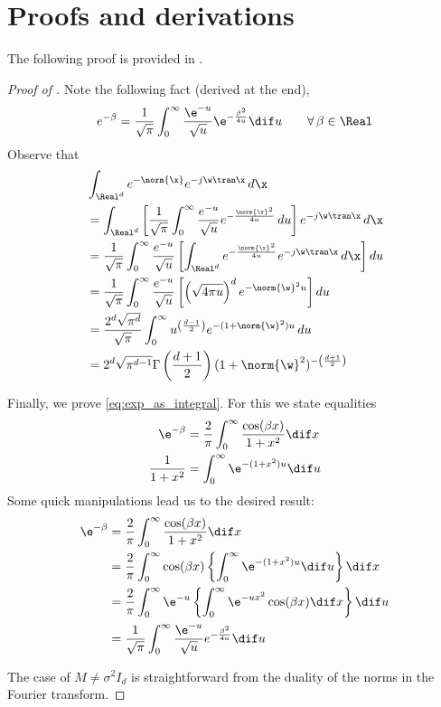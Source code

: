 \documentclass{article}
\def\cite{\citep}
\theoremstyle{plain}
\begin{document}
\section{Proofs and derivations}
\label{appendix:proofs}
The following proof is provided in \cite{Stein1971}.
\begin{proof}[Proof of ]
    Note the following fact (derived at the end),
    \begin{align}e^{-\beta}=  \frac{1}{\sqrt{\pi}} \int_0^{\infty} \frac{\e^{-
    u}}{\sqrt{u}} \e^{- \frac{\beta^2}{4 u} } \dif u\qquad \forall\, \beta\in\Real \label{eq:exp_as_integral}
    \end{align}
    Observe that
    \begin{align*}
    &\int_{\Real^d} e^{-\norm{\x}} e^{- j\w\tran\x}\mathop{d\x} \\
    &=\int_{\Real^d}
    \left[ \frac{1}{\sqrt{\pi}} \int_0^{\infty} \frac{e^{- u}}{\sqrt{u}}
    e^{- \frac{\norm{\x}^2}{4u} }\mathop{du} \right] e^{- j
    \w\tran\x}\mathop{d\x} \\
    &= \frac{1}{\sqrt{\pi}} \int_0^{\infty} \frac{e^{- u}}{\sqrt{u}}
    \left[ \int_{\Real^d} e^{- \frac{\norm{\x}^2}{4 u} }
    e^{- j \w\tran \x} \mathop{d\x} \right] \mathop{du}\\
    &= \frac{1}{\sqrt{\pi}} \int_0^{\infty} \frac{e^{- u}}{\sqrt{u}}
    \left[ \left( \sqrt{4 \pi u} \right)^d e^{-\norm{\w} ^2 u}
    \right] \mathop{du}  \\
    &= \frac{2^d \sqrt{\pi^d}}{\sqrt{\pi}}  \int_0^{\infty} 
    u^{\left( \frac{d - 1}{2} \right)} e^{-(1+\norm{\w}^2) u}
    \mathop{du} \\
    &= 2^d \sqrt{\pi^{d - 1}} \Gamma \left( \frac{d + 1}{2} \right)  (1 +
    \norm{\w}^2)^{- \left( \frac{d + 1}{2} \right)}
    \end{align*}

    Finally, we prove \cref{eq:exp_as_integral}. For this we state equalities
    \begin{align*}
        \e^{-\beta} &= \frac{2}{\pi}\int_0^\infty\frac{\cos(\beta x)}{1+x^2}\dif x \\
        \frac{1}{1+x^2} &= \int_0^\infty\e^{-(1+x^2)u}\dif u
    \end{align*}
    Some quick manipulations lead us to the desired result:
    \begin{align*}
        \e^{-\beta} &= \frac{2}{\pi}\int_0^\infty\frac{\cos(\beta x)}{1+x^2}\dif x \\
        &= \frac{2}{\pi}\int_0^\infty \cos(\beta x) \left\{ \int_0^\infty\e^{-(1+x^2)u}\dif u \right\}\dif x\\
        &= \frac{2}{\pi}\int_0^\infty \e^{-u}\left\{ \int_0^\infty\e^{-ux^2}\cos(\beta x)\dif x \right\}\dif u \\
        &= \frac{1}{\sqrt{\pi}} \int_0^{\infty} \frac{\e^{-u}}{\sqrt{u}} e^{- \frac{\beta^2}{4 u} } \dif u
    \end{align*}

The case of $M\neq \sigma^2 I_d$ is straightforward from the duality of the norms in the Fourier transform.
\end{proof}
\end{document}
